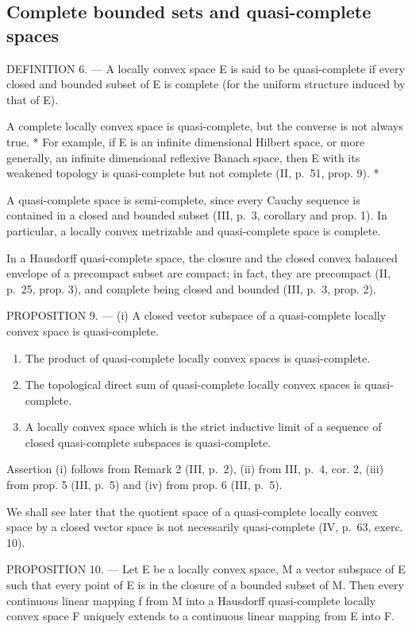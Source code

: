 \subsection{Complete bounded sets and quasi-complete spaces}

DEFINITION 6. --- A locally convex space E is said to be quasi-complete if every closed and bounded subset of E is complete (for the uniform structure induced by that of E).

A complete locally convex space is quasi-complete, but the converse is not always true. * For example, if E is an infinite dimensional Hilbert space, or more generally, an infinite dimensional reflexive Banach space, then E with its weakened topology is quasi-complete but not complete (II, p.~51, prop. 9). *

A quasi-complete space is semi-complete, since every Cauchy sequence is contained in a closed and bounded subset (III, p.~3, corollary and prop. 1). In particular, a locally convex metrizable and quasi-complete space is complete.

In a Hausdorff quasi-complete space, the closure and the closed convex balanced envelope of a precompact subset are compact; in fact, they are precompact (II, p.~25, prop. 3), and complete being closed and bounded (III, p.~3, prop. 2).

PROPOSITION 9. --- (i) A closed vector subspace of a quasi-complete locally convex space is quasi-complete.

\begin{enumerate}
\def\labelenumi{(\roman{enumi})}
\setcounter{enumi}{1}
\item
  The product of quasi-complete locally convex spaces is quasi-complete.
\item
  The topological direct sum of quasi-complete locally convex spaces is quasi-complete.
\item
  A locally convex space which is the strict inductive limit of a sequence of closed quasi-complete subspaces is quasi-complete.
\end{enumerate}

Assertion (i) follows from Remark 2 (III, p.~2), (ii) from III, p.~4, cor. 2, (iii) from prop. 5 (III, p.~5) and (iv) from prop. 6 (III, p.~5).

We shall see later that the quotient space of a quasi-complete locally convex space by a closed vector space is not necessarily quasi-complete (IV, p.~63, exerc. 10).

PROPOSITION 10. --- Let E be a locally convex space, M a vector subspace of E such that every point of E is in the closure of a bounded subset of M. Then every continuous linear mapping f from M into a Hausdorff quasi-complete locally convex space F uniquely extends to a continuous linear mapping from E into F.

